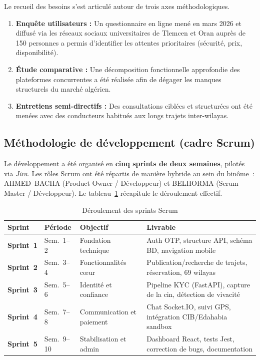 Le recueil des besoins s'est articulé autour de trois axes méthodologiques.
\begin{enumerate}
  \item \textbf{Enquête utilisateurs :} Un questionnaire en ligne mené en mars 2026 et diffusé via les réseaux sociaux universitaires de Tlemcen et Oran auprès de 150 personnes a permis d'identifier les attentes prioritaires (sécurité, prix, disponibilité).
  \item \textbf{Étude comparative :} Une décomposition fonctionnelle approfondie des plateformes concurrentes a été réalisée afin de dégager les manques structurels du marché algérien.
  \item \textbf{Entretiens semi-directifs :} Des consultations ciblées et structurées ont été menées avec des conducteurs habitués aux longs trajets inter-wilayas.
\end{enumerate}

\subsection{Méthodologie de développement (cadre Scrum)}
\label{sec:scrum-planning}

Le développement a été organisé en \textbf{cinq sprints de deux semaines}, pilotés via \textit{Jira}. Les rôles Scrum ont été répartis de manière hybride au sein du binôme~: AHMED~BACHA (Product Owner / Développeur) et BELHORMA (Scrum Master / Développeur). Le tableau~\ref{tab:sprints} récapitule le déroulement effectif.

\begin{table}[H]
\centering
\footnotesize
\renewcommand{\arraystretch}{1.3}
\begin{tabularx}{\textwidth}{|l|l|X|X|}
\hline
\rowcolor{rohlight}
\textbf{Sprint} & \textbf{Période} & \textbf{Objectif} & \textbf{Livrable} \\
\hline
\textbf{Sprint~1} & Sem.~1--2 & Fondation technique & Auth OTP, structure API, schéma BD, navigation mobile \\
\hline
\textbf{Sprint~2} & Sem.~3--4 & Fonctionnalités cœur & Publication/recherche de trajets, réservation, 69 wilayas \\
\hline
\textbf{Sprint~3} & Sem.~5--6 & Identité et confiance & Pipeline KYC (FastAPI), capture de la \gls{cin}, détection de vivacité \\
\hline
\textbf{Sprint~4} & Sem.~7--8 & Communication et paiement & Chat Socket.IO, suivi GPS, intégration CIB/Edahabia sandbox \\
\hline
\textbf{Sprint~5} & Sem.~9--10 & Stabilisation et admin & Dashboard React, tests Jest, correction de bugs, documentation \\
\hline
\end{tabularx}
  \caption{Déroulement des sprints Scrum}
  \label{tab:sprints}
\end{table}

